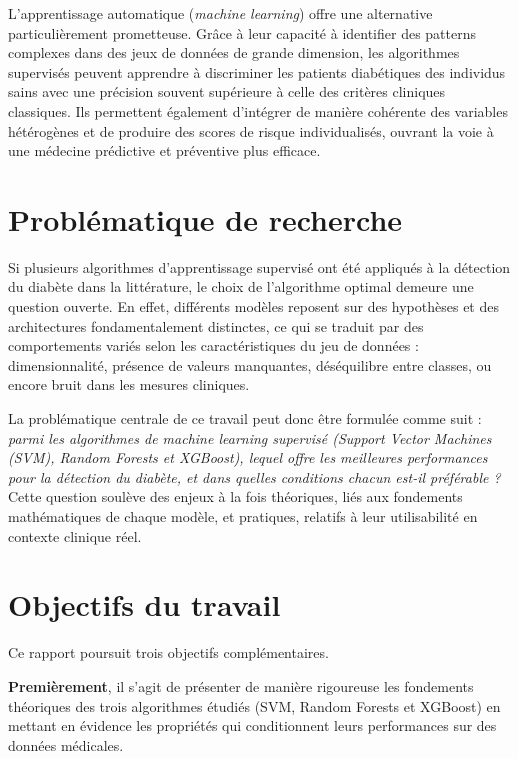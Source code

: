L'apprentissage automatique (\textit{machine learning}) offre une alternative particulièrement
prometteuse. Grâce à leur capacité à identifier des patterns complexes dans des jeux de
données de grande dimension, les algorithmes supervisés peuvent apprendre à discriminer
les patients diabétiques des individus sains avec une précision souvent supérieure à celle
des critères cliniques classiques. Ils permettent également d'intégrer de manière cohérente
des variables hétérogènes et de produire des scores de risque individualisés, ouvrant la
voie à une médecine prédictive et préventive plus efficace.

\section*{Problématique de recherche}

Si plusieurs algorithmes d'apprentissage supervisé ont été appliqués à la détection du
diabète dans la littérature, le choix de l'algorithme optimal demeure une question ouverte.
En effet, différents modèles reposent sur des hypothèses et des architectures fondamentalement distinctes, ce qui se traduit par des comportements variés selon les caractéristiques
du jeu de données : dimensionnalité, présence de valeurs manquantes, déséquilibre entre
classes, ou encore bruit dans les mesures cliniques.

La problématique centrale de ce travail peut donc être formulée comme suit :
\textit{parmi les algorithmes de machine learning supervisé (Support Vector Machines (SVM),
	Random Forests et XGBoost), lequel offre les meilleures performances pour la détection
	du diabète, et dans quelles conditions chacun est-il préférable ?} Cette question soulève
des enjeux à la fois théoriques, liés aux fondements mathématiques de chaque modèle,
et pratiques, relatifs à leur utilisabilité en contexte clinique réel.

\section*{Objectifs du travail}

Ce rapport poursuit trois objectifs complémentaires.

\textbf{Premièrement}, il s'agit de présenter de manière rigoureuse les fondements théoriques
des trois algorithmes étudiés (SVM, Random Forests et XGBoost) en mettant en
évidence les propriétés qui conditionnent leurs performances sur des données médicales.

